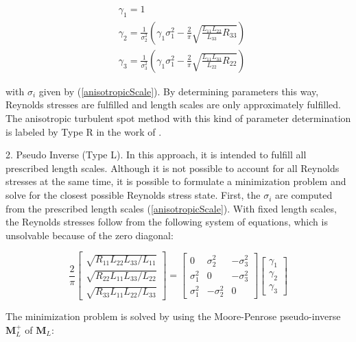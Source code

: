 \begin{equation}
\begin{split}
    &\gamma_1 = 1 \\
    &\gamma_2 = \frac{1}{\sigma_2^2}\left(\gamma_1\sigma_1^2-\frac{2}{\pi}\sqrt{\frac{L_{11}L_{22}}{L_{33}}R_{33}}\right) \\
    &\gamma_3 = \frac{1}{\sigma_3^2}\left(\gamma_1\sigma_1^2-\frac{2}{\pi}\sqrt{\frac{L_{11}L_{33}}{L_{22}}R_{22}}\right)
\end{split}
\end{equation}

\noindent with $\sigma_i$ given by (\ref{anisotropicScale}). By determining parameters this way, Reynolds stresses are fulfilled and length scales are only approximately fulfilled. The anisotropic turbulent spot method with this kind of parameter determination is labeled by Type R in the work of \cite{kroger2018}.

2. Pseudo Inverse (Type L). In this approach, it is intended to fulfill all prescribed length scales. Although it is not possible to account for all Reynolds stresses at the same time, it is possible to formulate a minimization problem and solve for the closest possible Reynolds stress state. First, the $\sigma_i$ are computed from the prescribed length scales (\ref{anisotropicScale}). With fixed length scales, the Reynolds stresses follow from the following system of equations, which is unsolvable because of the zero diagonal:

\begin{equation}
\frac{2}{\pi}
\begin{bmatrix}
\sqrt{R_{11}L_{22}L_{33}/L_{11}} \\
\sqrt{R_{22}L_{11}L_{33}/L_{22}} \\
\sqrt{R_{33}L_{11}L_{22}/L_{33}}
\end{bmatrix}=
\begin{bmatrix}
0 & \sigma_2^2 &  -\sigma_3^2 \\
\sigma_1^2 & 0 & -\sigma_3^2 \\
\sigma_1^2 & -\sigma_2^2 & 0
\end{bmatrix}
\begin{bmatrix}
\gamma_1 \\
\gamma_2 \\
\gamma_3
\end{bmatrix}
\end{equation}

\noindent The minimization problem is solved by using the Moore-Penrose pseudo-inverse $\boldsymbol{M}_L^+$ of $\boldsymbol{M}_L$:

